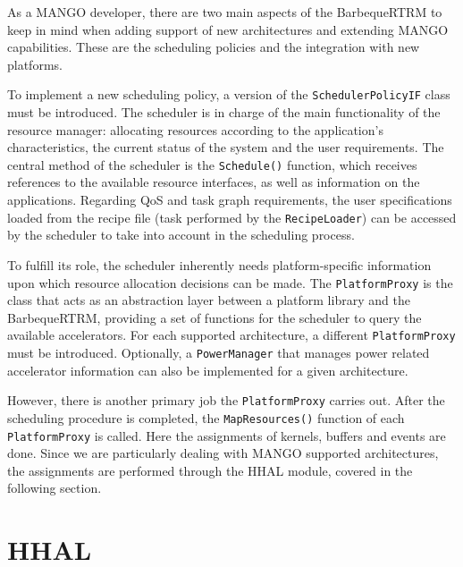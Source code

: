 As a MANGO developer, there are two main aspects of the BarbequeRTRM to keep in mind when adding support of new architectures and extending MANGO capabilities. These are the scheduling policies and the integration with new platforms.

To implement a new scheduling policy, a version of the \texttt{SchedulerPolicyIF} class must be introduced. The scheduler is in charge of the main functionality of the resource manager: allocating resources according to the application's characteristics, the current status of the system and the user requirements. 
The central method of the scheduler is the \texttt{Schedule()} function, which receives references to the available resource interfaces, as well as information on the applications.
Regarding QoS and task graph requirements, the user specifications loaded from the recipe file (task performed by the \texttt{RecipeLoader}) can be accessed by the scheduler to take into account in the scheduling process.

To fulfill its role, the scheduler inherently needs platform-specific information upon which resource allocation decisions can be made. The \texttt{PlatformProxy} is the class that acts as an abstraction layer between a platform library and the BarbequeRTRM, providing a set of functions for the scheduler to query the available accelerators. For each supported architecture, a different \texttt{PlatformProxy} must be introduced. Optionally, a \texttt{PowerManager} that manages power related accelerator information can also be implemented for a given architecture.

However, there is another primary job the \texttt{PlatformProxy} carries out. After the scheduling procedure is completed, the \texttt{MapResources()} function of each \texttt{PlatformProxy} is called. Here the assignments of kernels, buffers and events are done. Since we are particularly dealing with MANGO supported architectures, the assignments are performed through the HHAL module, covered in the following section.

\section{HHAL} \label{HHAL}

